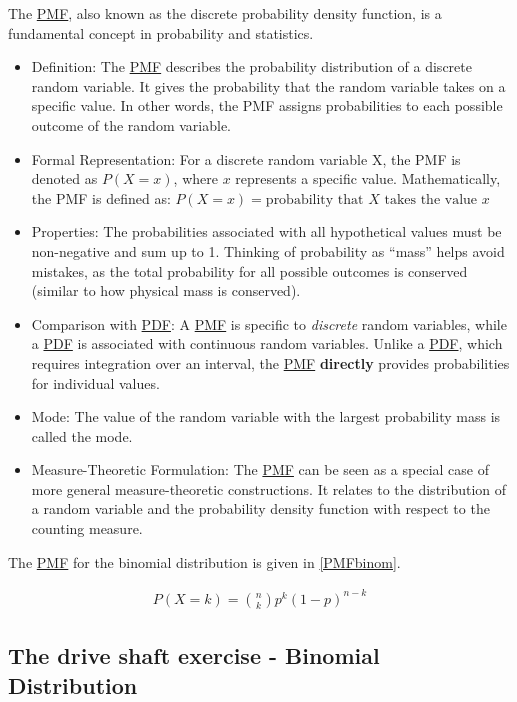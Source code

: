 \documentclass[
  a4paper,
]{scrbook}
\begin{document}
The \hyperref[acronyms_PMF]{PMF}, also known as the discrete probability
density function, is a fundamental concept in probability and
statistics.

\begin{itemize}
\item
  Definition: The \hyperref[acronyms_PMF]{PMF} describes the probability
  distribution of a discrete random variable. It gives the probability
  that the random variable takes on a specific value. In other words,
  the PMF assigns probabilities to each possible outcome of the random
  variable.
\item
  Formal Representation: For a discrete random variable X, the PMF is
  denoted as \(P(X = x)\), where \(x\) represents a specific value.
  Mathematically, the PMF is defined as:
  \(P(X = x) = \text{{probability that }} X \text{{ takes the value }} x\)
\item
  Properties: The probabilities associated with all hypothetical values
  must be non-negative and sum up to 1. Thinking of probability as
  ``mass'' helps avoid mistakes, as the total probability for all
  possible outcomes is conserved (similar to how physical mass is
  conserved).
\item
  Comparison with \hyperref[acronyms_PDF]{PDF}: A
  \hyperref[acronyms_PMF]{PMF} is specific to \emph{discrete} random
  variables, while a \hyperref[acronyms_PDF]{PDF} is associated with
  continuous random variables. Unlike a \hyperref[acronyms_PDF]{PDF},
  which requires integration over an interval, the
  \hyperref[acronyms_PMF]{PMF} \textbf{directly} provides probabilities
  for individual values.
\item
  Mode: The value of the random variable with the largest probability
  mass is called the mode.
\item
  Measure-Theoretic Formulation: The \hyperref[acronyms_PMF]{PMF} can be
  seen as a special case of more general measure-theoretic
  constructions. It relates to the distribution of a random variable and
  the probability density function with respect to the counting measure.
\end{itemize}

The \hyperref[acronyms_PMF]{PMF} for the binomial distribution is given
in \eqref{PMFbinom}.

\begin{align}
P(X = k) = \binom{n}{k} p^k (1 - p)^{n - k} \label{PMFbinom}
\end{align}

\subsection{The drive shaft exercise - Binomial
Distribution}\label{the-drive-shaft-exercise---binomial-distribution}
\end{document}
